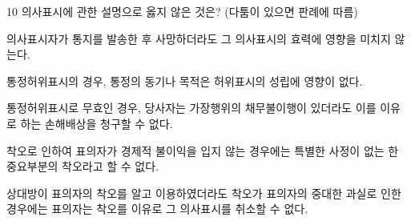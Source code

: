 \begin{question}{10}
의사표시에 관한 설명으로 옳지 않은 것은? (다툼이 있으면 판례에 따름)
\begin{choices}
  \item 의사표시자가 통지를 발송한 후 사망하더라도 그 의사표시의 효력에 영향을 미치지 않는다.
  \item 통정허위표시의 경우, 통정의 동기나 목적은 허위표시의 성립에 영향이 없다.
  \item 통정허위표시로 무효인 경우, 당사자는 가장행위의 채무불이행이 있더라도 이를 이유로 하는 손해배상을 청구할 수 없다.
  \item 착오로 인하여 표의자가 경제적 불이익을 입지 않는 경우에는 특별한 사정이 없는 한 중요부분의 착오라고 할 수 없다.
  \item 상대방이 표의자의 착오를 알고 이용하였더라도 착오가 표의자의 중대한 과실로 인한 경우에는 표의자는 착오를 이유로 그 의사표시를 취소할 수 없다.
\end{choices}
\end{question}
